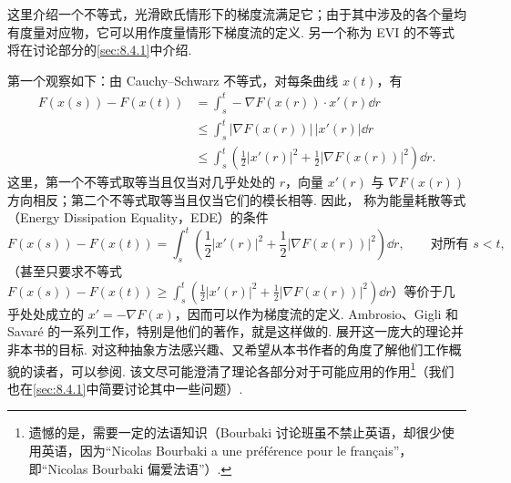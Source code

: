 这里介绍一个不等式，光滑欧氏情形下的梯度流满足它；由于其中涉及的各个量均有度量对应物，它可以用作度量情形下梯度流的定义. 另一个称为 EVI 的不等式将在讨论部分的\autoref{sec:8.4.1}中介绍.

第一个观察如下：由 Cauchy--Schwarz 不等式，对每条曲线 $x(t)$，有
\[
\begin{aligned}
F(x(s))-F(x(t))
&=\int_s^t-\nabla F(x(r))\cdot x'(r)\dd r\\
&\leq\int_s^t|\nabla F(x(r))|\,|x'(r)|\dd r\\
&\leq\int_s^t\left(\frac12|x'(r)|^2+\frac12|\nabla F(x(r))|^2\right)\dd r.
\end{aligned}
\]
这里，第一个不等式取等当且仅当对几乎处处的 $r$，向量 $x'(r)$ 与 $\nabla F(x(r))$ 方向相反；第二个不等式取等当且仅当它们的模长相等. 因此，\label{idx:i49-p290}
称为能量耗散等式（Energy Dissipation Equality，EDE）的条件
\[
F(x(s))-F(x(t))=\int_s^t\left(\frac12|x'(r)|^2+\frac12|\nabla F(x(r))|^2\right)\dd r,
\qquad\text{对所有 }s<t,
\]
（甚至只要求不等式 $F(x(s))-F(x(t))\geq\int_s^t(\frac12|x'(r)|^2+\frac12|\nabla F(x(r))|^2)\dd r$）等价于几乎处处成立的 $x'=-\nabla F(x)$，因而可以作为梯度流的定义. Ambrosio、Gigli 和 Savar\'e 的一系列工作，特别是他们的著作\cite{b15}，就是这样做的. 展开这一庞大的理论并非本书的目标. 对这种抽象方法感兴趣、又希望从本书作者的角度了解他们工作概貌的读者，可以参阅\cite{b277}. 该文尽可能澄清了理论各部分对于可能应用的作用\footnote{遗憾的是，需要一定的法语知识（Bourbaki 讨论班虽不禁止英语，却很少使用英语，因为“Nicolas Bourbaki a une pr\'ef\'erence pour le fran\c{c}ais”，即“Nicolas Bourbaki 偏爱法语”）.}（我们也在\autoref{sec:8.4.1}中简要讨论其中一些问题）.
